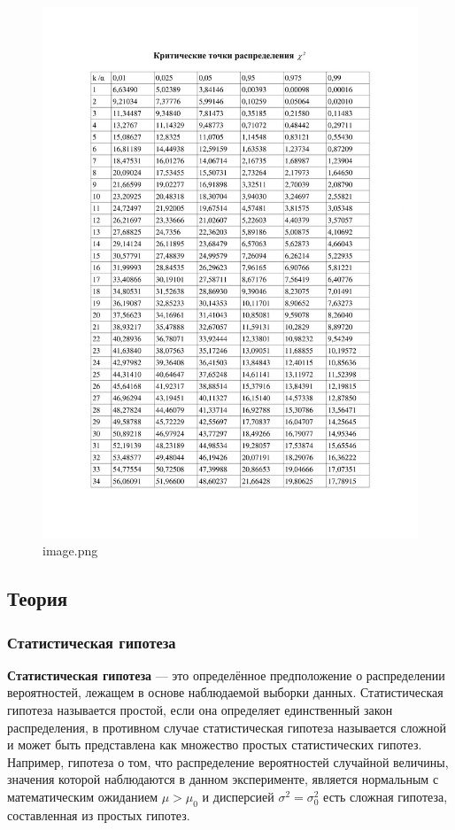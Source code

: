 \documentclass[11pt]{article}
\def\gt{>}
\begin{document}
\begin{figure}
\centering
\includegraphics{d6c208f7-a9f8-4a12-b9de-022130f50fb8.png}
\caption{image.png}
\end{figure}

    \subsection{Теория}\label{ux442ux435ux43eux440ux438ux44f}

\subsubsection{Статистическая
гипотеза}\label{ux441ux442ux430ux442ux438ux441ux442ux438ux447ux435ux441ux43aux430ux44f-ux433ux438ux43fux43eux442ux435ux437ux430}

\textbf{Статистическая гипотеза} --- это определённое предположение о
распределении вероятностей, лежащем в основе наблюдаемой выборки данных.
Статистическая гипотеза называется простой, если она определяет
единственный закон распределения, в противном случае статистическая
гипотеза называется сложной и может быть представлена как множество
простых статистических гипотез. Например, гипотеза о том, что
распределение вероятностей случайной величины, значения которой
наблюдаются в данном эксперименте, является нормальным с математическим
ожиданием \(\mu\gt\mu_0\) и дисперсией \(\sigma^2=\sigma^2_0\) есть
сложная гипотеза, составленная из простых гипотез.
\end{document}
